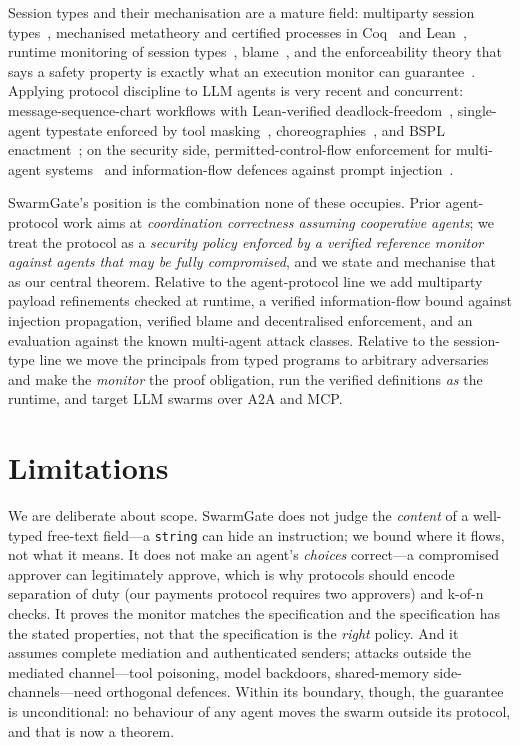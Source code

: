\documentclass[10pt,twocolumn]{article}
\newcommand{\code}[1]{\texttt{\small #1}}
\begin{document}
Session types and their mechanisation are a mature field: multiparty session
types~\cite{honda2008mpst,honda2016mpst,scalas2019less}, mechanised metatheory and certified processes in
Coq~\cite{castroperez2021zooid,tirore2023sound,keskin2026liveness} and
Lean~\cite{qin2026mech}, runtime monitoring of session types~\cite{bocchi2017monitoring,larsen2026nest},
blame~\cite{jia2016blame}, and the enforceability theory that says a safety property is exactly what an
execution monitor can guarantee~\cite{schneider2000enforceable,ligatti2005edit}. Applying protocol
discipline to LLM agents is very recent and concurrent: message-sequence-chart workflows with Lean-verified
deadlock-freedom~\cite{bollig2026provable}, single-agent typestate enforced by tool
masking~\cite{sikaroudi2026concordat}, choreographies~\cite{gopinathan2026pact}, and BSPL
enactment~\cite{joshi2026ahoy}; on the security side, permitted-control-flow enforcement for multi-agent
systems~\cite{triedman2025mas} and information-flow defences against prompt
injection~\cite{debenedetti2025camel,beurerkellner2025designpatterns}.

SwarmGate's position is the combination none of these occupies. Prior agent-protocol work aims at
\emph{coordination correctness assuming cooperative agents}; we treat the protocol as a \emph{security
policy enforced by a verified reference monitor against agents that may be fully compromised}, and we state
and mechanise that as our central theorem. Relative to the agent-protocol line we add multiparty payload
refinements checked at runtime, a verified information-flow bound against injection propagation, verified
blame and decentralised enforcement, and an evaluation against the known multi-agent attack classes.
Relative to the session-type line we move the principals from typed programs to arbitrary adversaries and
make the \emph{monitor} the proof obligation, run the verified definitions \emph{as} the runtime, and
target LLM swarms over A2A and MCP.

\section{Limitations}

We are deliberate about scope. SwarmGate does not judge the \emph{content} of a well-typed free-text
field---a \code{string} can hide an instruction; we bound where it flows, not what it means. It does not
make an agent's \emph{choices} correct---a compromised approver can legitimately approve, which is why
protocols should encode separation of duty (our payments protocol requires two approvers) and k-of-n
checks. It proves the monitor matches the specification and the specification has the stated properties,
not that the specification is the \emph{right} policy. And it assumes complete mediation and authenticated
senders; attacks outside the mediated channel---tool poisoning, model backdoors, shared-memory
side-channels---need orthogonal defences. Within its boundary, though, the guarantee is unconditional: no
behaviour of any agent moves the swarm outside its protocol, and that is now a theorem.

{\footnotesize


}
\end{document}

